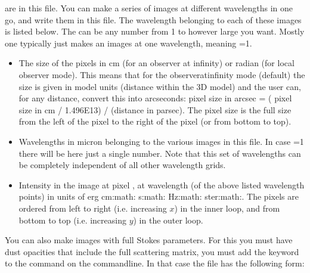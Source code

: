 \documentclass[letterpaper,10pt,english]{sphinxmanual}
\begin{document}
are in this file. You can make a series of images at different wavelengths
in one go, and write them in this file. The wavelength belonging to each of
these images is listed below. The  can be any number from 1 to
however large you want. Mostly one typically just makes an images at one
wavelength, meaning =1.
\begin{itemize}
\item {} 
 The size of the pixels in cm (for an observer at
infinity) or radian (for local observer mode).  This means that for the
observer\sphinxhyphen{}at\sphinxhyphen{}infinity mode (default) the size is given in model units (distance
within the 3\sphinxhyphen{}D model) and the user can, for any distance, convert this into
arcseconds: pixel size in arcsec = ( pixel size in cm / 1.496E13) / (distance
in parsec). The pixel size is the full size from the left of the pixel to the
right of the pixel (or from bottom to top).

\item {} 
 Wavelengths in micron belonging to the various images in this
file. In case =1 there will be here just a single number. Note that
this set of wavelengths can be completely independent of all other wavelength
grids.

\item {} 
 Intensity in the image at pixel ,  at
wavelength  (of the above listed wavelength points) in units of erg
cm:math: s:math: Hz:math: ster:math:. 
The pixels are ordered from left to right (i.e. increasing \(x\)) in the
inner loop, and from bottom to top (i.e. increasing \(y\)) in the outer
loop.

\end{itemize}

You can also make images with full Stokes parameters. For this you must have
dust opacities that include the full scattering matrix,  you must
add the keyword  to the  command
on the command\sphinxhyphen{}line. In that case the  file has the
following form:
\end{document}

